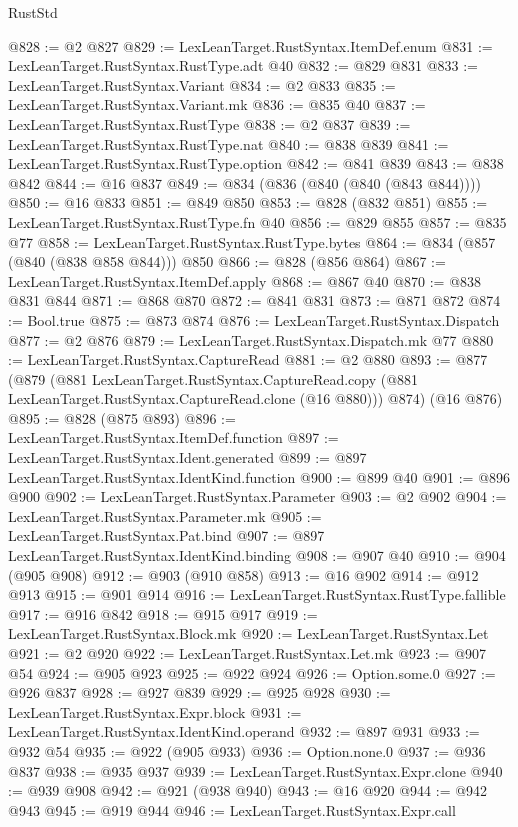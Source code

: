 \begin{lexlean}{RustStd}
\begin{coremodule}
@828 := @2 @827
@829 := LexLeanTarget.RustSyntax.ItemDef.enum
@831 := LexLeanTarget.RustSyntax.RustType.adt @40
@832 := @829 @831
@833 := LexLeanTarget.RustSyntax.Variant
@834 := @2 @833
@835 := LexLeanTarget.RustSyntax.Variant.mk
@836 := @835 @40
@837 := LexLeanTarget.RustSyntax.RustType
@838 := @2 @837
@839 := LexLeanTarget.RustSyntax.RustType.nat
@840 := @838 @839
@841 := LexLeanTarget.RustSyntax.RustType.option
@842 := @841 @839
@843 := @838 @842
@844 := @16 @837
@849 := @834 (@836 (@840 (@840 (@843 @844))))
@850 := @16 @833
@851 := @849 @850
@853 := @828 (@832 @851)
@855 := LexLeanTarget.RustSyntax.RustType.fn @40
@856 := @829 @855
@857 := @835 @77
@858 := LexLeanTarget.RustSyntax.RustType.bytes
@864 := @834 (@857 (@840 (@838 @858 @844))) @850
@866 := @828 (@856 @864)
@867 := LexLeanTarget.RustSyntax.ItemDef.apply
@868 := @867 @40
@870 := @838 @831 @844
@871 := @868 @870
@872 := @841 @831
@873 := @871 @872
@874 := Bool.true
@875 := @873 @874
@876 := LexLeanTarget.RustSyntax.Dispatch
@877 := @2 @876
@879 := LexLeanTarget.RustSyntax.Dispatch.mk @77
@880 := LexLeanTarget.RustSyntax.CaptureRead
@881 := @2 @880
@893 := @877
    (@879
      (@881
        LexLeanTarget.RustSyntax.CaptureRead.copy
        (@881 LexLeanTarget.RustSyntax.CaptureRead.clone (@16 @880)))
      @874)
    (@16 @876)
@895 := @828 (@875 @893)
@896 := LexLeanTarget.RustSyntax.ItemDef.function
@897 := LexLeanTarget.RustSyntax.Ident.generated
@899 := @897 LexLeanTarget.RustSyntax.IdentKind.function
@900 := @899 @40
@901 := @896 @900
@902 := LexLeanTarget.RustSyntax.Parameter
@903 := @2 @902
@904 := LexLeanTarget.RustSyntax.Parameter.mk
@905 := LexLeanTarget.RustSyntax.Pat.bind
@907 := @897 LexLeanTarget.RustSyntax.IdentKind.binding
@908 := @907 @40
@910 := @904 (@905 @908)
@912 := @903 (@910 @858)
@913 := @16 @902
@914 := @912 @913
@915 := @901 @914
@916 := LexLeanTarget.RustSyntax.RustType.fallible
@917 := @916 @842
@918 := @915 @917
@919 := LexLeanTarget.RustSyntax.Block.mk
@920 := LexLeanTarget.RustSyntax.Let
@921 := @2 @920
@922 := LexLeanTarget.RustSyntax.Let.mk
@923 := @907 @54
@924 := @905 @923
@925 := @922 @924
@926 := Option.some.{0}
@927 := @926 @837
@928 := @927 @839
@929 := @925 @928
@930 := LexLeanTarget.RustSyntax.Expr.block
@931 := LexLeanTarget.RustSyntax.IdentKind.operand
@932 := @897 @931
@933 := @932 @54
@935 := @922 (@905 @933)
@936 := Option.none.{0}
@937 := @936 @837
@938 := @935 @937
@939 := LexLeanTarget.RustSyntax.Expr.clone
@940 := @939 @908
@942 := @921 (@938 @940)
@943 := @16 @920
@944 := @942 @943
@945 := @919 @944
@946 := LexLeanTarget.RustSyntax.Expr.call

\end{coremodule}
\end{lexlean}
